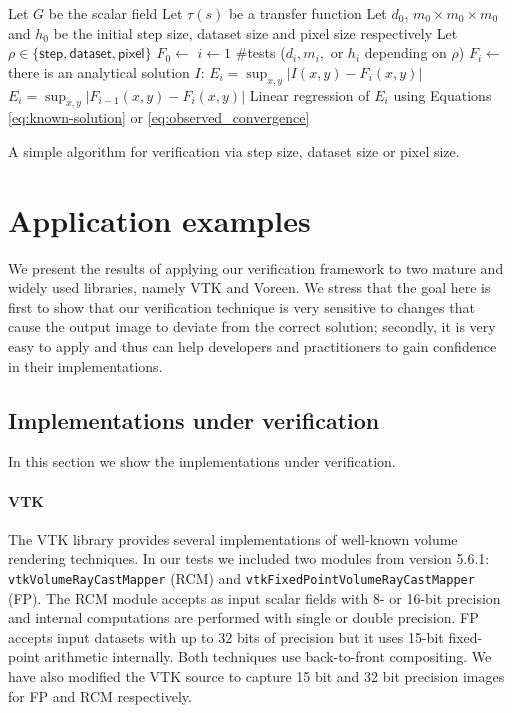 \begin{algorithm}
\begin{codebox}
\li \Comment Let $G$ be the scalar field
\li \Comment Let $\tau(s)$ be a transfer function
\li \Comment Let $d_0$, $m_0 \times m_0 \times m_0$ and $h_0$ be the initial step size,
\zi  dataset size and pixel size respectively
\li \Comment Let  $\rho \in \{ \textsf{step}, \textsf{dataset}, \textsf{pixel} \}$
\li $F_0 \gets$ 
\li \For $i \gets 1$ \To $\#$tests
\li     \Do {}($d_i, m_i, \text{ or } h_i$ depending on $\rho$)
\li         $F_i \gets$ 
\li         \If there is an analytical solution $I$:
\li            \Then $E_i = \sup_{x,y} | I(x,y) - F_{i}(x,y)|$
\li         \Else  $E_i = \sup_{x,y} | F_{i-1}(x,y) - F_{i}(x,y)|$
            \End
       \End
\li Linear regression of $E_i$ using Equations
\eqref{eq:known-solution} or \eqref{eq:observed_convergence}
\end{codebox}
\caption{A simple algorithm for verification via step size, dataset
  size or pixel size.}
\label{alg:verification-procedure}
\end{algorithm}


\section{Application examples}
\label{chap5:sec:results}

We present the results of applying our verification framework to two
mature and widely used libraries, namely VTK and Voreen. We stress
that the goal here is first to show that our verification technique is
very sensitive to changes that cause the output image to deviate from
the correct solution; secondly, it is very easy to apply and thus can
help developers and practitioners to gain confidence in their
implementations.

\subsection{Implementations under verification}

In this section we show the implementations under verification.

\paragraph*{VTK} 
The VTK library provides several implementations of well-known volume
rendering techniques. In our tests we included two modules from
version 5.6.1: \texttt{vtk\-Volume\-Ray\-Cast\-Mapper} (RCM) and
\texttt{vtkFixedPointVolumeRayCastMapper} (FP).  The RCM module
accepts as input scalar fields with 8- or 16-bit precision and internal
computations are performed with single or double precision.  FP
accepts input datasets with up to 32 bits of precision but it uses 15-bit
fixed-point arithmetic internally.  Both techniques use
back-to-front compositing. We have also modified the VTK source to
capture 15 bit and 32 bit precision images for FP and RCM
respectively.


